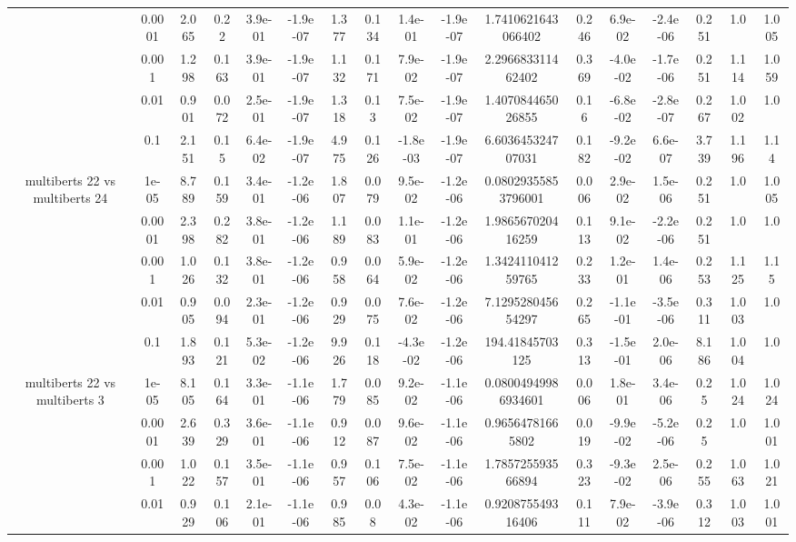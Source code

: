 \begin{tabular}{|c|c|c|c|c|c|c|c|c|c|c|c|c|c|c|c|c|}
 & 0.0001 & 2.065 & 0.22 & 3.9e-01 & -1.9e-07 & 1.377 & 0.134 & 1.4e-01 & -1.9e-07 & 1.7410621643066402 & 0.246 & 6.9e-02 & -2.4e-06 & 0.251 & 1.0 & 1.005 \\
 & 0.001 & 1.298 & 0.163 & 3.9e-01 & -1.9e-07 & 1.132 & 0.171 & 7.9e-02 & -1.9e-07 & 2.296683311462402 & 0.369 & -4.0e-02 & -1.7e-06 & 0.251 & 1.114 & 1.059 \\
 & 0.01 & 0.901 & 0.072 & 2.5e-01 & -1.9e-07 & 1.318 & 0.13 & 7.5e-02 & -1.9e-07 & 1.407084465026855 & 0.16 & -6.8e-02 & -2.8e-07 & 0.267 & 1.002 & 1.0 \\
 & 0.1 & 2.151 & 0.15 & 6.4e-02 & -1.9e-07 & 4.975 & 0.126 & -1.8e-03 & -1.9e-07 & 6.603645324707031 & 0.182 & -9.2e-02 & 6.6e-07 & 3.739 & 1.196 & 1.14 \\
\hline
\multirow{5}{*}{multiberts 22 vs multiberts 24} & 1e-05 & 8.789 & 0.159 & 3.4e-01 & -1.2e-06 & 1.807 & 0.079 & 9.5e-02 & -1.2e-06 & 0.08029355853796001 & 0.006 & 2.9e-02 & 1.5e-06 & 0.251 & 1.0 & 1.005 \\
 & 0.0001 & 2.398 & 0.282 & 3.8e-01 & -1.2e-06 & 1.189 & 0.083 & 1.1e-01 & -1.2e-06 & 1.986567020416259 & 0.113 & 9.1e-02 & -2.2e-06 & 0.251 & 1.0 & 1.0 \\
 & 0.001 & 1.026 & 0.132 & 3.8e-01 & -1.2e-06 & 0.958 & 0.064 & 5.9e-02 & -1.2e-06 & 1.342411041259765 & 0.233 & 1.2e-01 & 1.4e-06 & 0.253 & 1.125 & 1.15 \\
 & 0.01 & 0.905 & 0.094 & 2.3e-01 & -1.2e-06 & 0.929 & 0.075 & 7.6e-02 & -1.2e-06 & 7.129528045654297 & 0.265 & -1.1e-01 & -3.5e-06 & 0.311 & 1.003 & 1.0 \\
 & 0.1 & 1.893 & 0.121 & 5.3e-02 & -1.2e-06 & 9.926 & 0.118 & -4.3e-02 & -1.2e-06 & 194.41845703125 & 0.313 & -1.5e-01 & 2.0e-06 & 8.186 & 1.004 & 1.0 \\
\hline
\multirow{5}{*}{multiberts 22 vs multiberts 3} & 1e-05 & 8.105 & 0.164 & 3.3e-01 & -1.1e-06 & 1.779 & 0.085 & 9.2e-02 & -1.1e-06 & 0.08004949986934601 & 0.006 & 1.8e-01 & 3.4e-06 & 0.25 & 1.024 & 1.024 \\
 & 0.0001 & 2.639 & 0.329 & 3.6e-01 & -1.1e-06 & 0.912 & 0.087 & 9.6e-02 & -1.1e-06 & 0.96564781665802 & 0.019 & -9.9e-02 & -5.2e-06 & 0.25 & 1.0 & 1.001 \\
 & 0.001 & 1.022 & 0.157 & 3.5e-01 & -1.1e-06 & 0.957 & 0.106 & 7.5e-02 & -1.1e-06 & 1.785725593566894 & 0.323 & -9.3e-02 & 2.5e-06 & 0.255 & 1.063 & 1.021 \\
 & 0.01 & 0.929 & 0.106 & 2.1e-01 & -1.1e-06 & 0.985 & 0.08 & 4.3e-02 & -1.1e-06 & 0.920875549316406 & 0.111 & 7.9e-02 & -3.9e-06 & 0.312 & 1.003 & 1.001 \\

\end{tabular}
